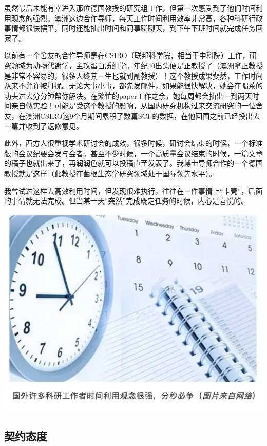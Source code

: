 \documentclass[
]{book}
\begin{document}
虽然最后未能有幸进入那位德国教授的研究组工作，但第一次感受到了他们时间利用观念的强烈。澳洲这边合作导师，每天工作时间利用效率非常高，各种科研行政事情都很快摆平，同时还能抽出时间和同事聊聊天，到下午下班时间就完成任务回家了。

以前有一个舍友的合作导师是在CSIRO（联邦科学院，相当于中科院）工作，研究领域为动物代谢学，主攻蛋白质组学。年纪40出头便是正教授了（澳洲拿正教授是非常不容易的，很多人终其一生也就到副教授）！这个教授成果斐然，工作时间从来不允许被打扰。无论大事小事，都先发邮件，如果能很快解决，她会在喝茶的功夫过去分分钟帮你解决。在繁忙的paper工作之余，她每周都会抽出一到两天时间亲自做实验！可能是受这个教授的影响，从国内研究机构过来交流研究的一位舍友，在澳洲CSIRO这9个月期间累积了数篇SCI 的数据，在他回国之前已经投出去一篇并收到了返修意见。

此外，西方人很重视学术研讨会的成效，很多时候，研讨会结束的时候，一个标准版的会议纪要会发与会者。甚至不少时候，一个高质量会议结束的时候，一篇文章的稿子也就出来了，再润润色就可以投稿直至发表了。我博士导师合作的一个德国教授就是这样（此教授在菌根生态学研究领域处于国际领先水平）。

我曾试过这样去高效利用时间，但发现很难执行，往往在一件事情上``卡壳''，后面的事情就无法完成。但当某一天``突然''完成既定任务的时候，内心是喜悦的。

\includegraphics[width=8.33in]{images/osre4}

\hypertarget{ux5951ux7ea6ux6001ux5ea6}{%
\subsection{契约态度}\label{ux5951ux7ea6ux6001ux5ea6}}
\end{document}
